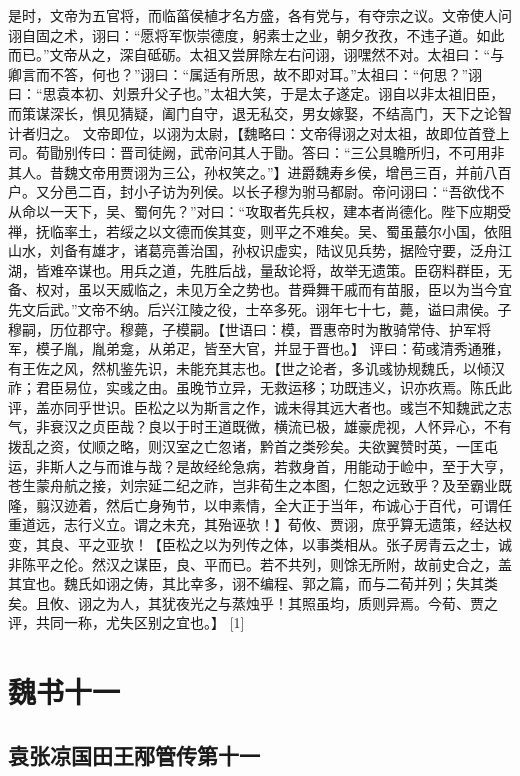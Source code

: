 \documentclass[12pt,UTF8]{ctexbook}
\begin{document}
是时，文帝为五官将，而临菑侯植才名方盛，各有党与，有夺宗之议。文帝使人问诩自固之术，诩曰：“愿将军恢崇德度，躬素士之业，朝夕孜孜，不违子道。如此而已。”文帝从之，深自砥砺。太祖又尝屏除左右问诩，诩嘿然不对。太祖曰：“与卿言而不答，何也？”诩曰：“属适有所思，故不即对耳。”太祖曰：“何思？”诩曰：“思袁本初、刘景升父子也。”太祖大笑，于是太子遂定。诩自以非太祖旧臣，而策谋深长，惧见猜疑，阖门自守，退无私交，男女嫁娶，不结高门，天下之论智计者归之。
文帝即位，以诩为太尉，【魏略曰：文帝得诩之对太祖，故即位首登上司。荀勖别传曰：晋司徒阙，武帝问其人于勖。答曰：“三公具瞻所归，不可用非其人。昔魏文帝用贾诩为三公，孙权笑之。”】进爵魏寿乡侯，增邑三百，并前八百户。又分邑二百，封小子访为列侯。以长子穆为驸马都尉。帝问诩曰：“吾欲伐不从命以一天下，吴、蜀何先？”对曰：“攻取者先兵权，建本者尚德化。陛下应期受禅，抚临率土，若绥之以文德而俟其变，则平之不难矣。吴、蜀虽蕞尔小国，依阻山水，刘备有雄才，诸葛亮善治国，孙权识虚实，陆议见兵势，据险守要，泛舟江湖，皆难卒谋也。用兵之道，先胜后战，量敌论将，故举无遗策。臣窃料群臣，无备、权对，虽以天威临之，未见万全之势也。昔舜舞干戚而有苗服，臣以为当今宜先文后武。”文帝不纳。后兴江陵之役，士卒多死。诩年七十七，薨，谥曰肃侯。子穆嗣，历位郡守。穆薨，子模嗣。【世语曰：模，晋惠帝时为散骑常侍、护军将军，模子胤，胤弟龛，从弟疋，皆至大官，并显于晋也。】
评曰：荀彧清秀通雅，有王佐之风，然机鉴先识，未能充其志也。【世之论者，多讥彧协规魏氏，以倾汉祚；君臣易位，实彧之由。虽晚节立异，无救运移；功既违义，识亦疚焉。陈氏此评，盖亦同乎世识。臣松之以为斯言之作，诚未得其远大者也。彧岂不知魏武之志气，非衰汉之贞臣哉？良以于时王道既微，横流已极，雄豪虎视，人怀异心，不有拨乱之资，仗顺之略，则汉室之亡忽诸，黔首之类殄矣。夫欲翼赞时英，一匡屯运，非斯人之与而谁与哉？是故经纶急病，若救身首，用能动于崄中，至于大亨，苍生蒙舟航之接，刘宗延二纪之祚，岂非荀生之本图，仁恕之远致乎？及至霸业既隆，翦汉迹着，然后亡身殉节，以申素情，全大正于当年，布诚心于百代，可谓任重道远，志行义立。谓之未充，其殆诬欤！】荀攸、贾诩，庶乎算无遗策，经达权变，其良、平之亚欤！【臣松之以为列传之体，以事类相从。张子房青云之士，诚非陈平之伦。然汉之谋臣，良、平而已。若不共列，则馀无所附，故前史合之，盖其宜也。魏氏如诩之俦，其比幸多，诩不编程、郭之篇，而与二荀并列；失其类矣。且攸、诩之为人，其犹夜光之与蒸烛乎！其照虽均，质则异焉。今荀、贾之评，共同一称，尤失区别之宜也。】 [1]


\part{魏书十一}
\chapter{袁张凉国田王邴管传第十一}
\end{document}
